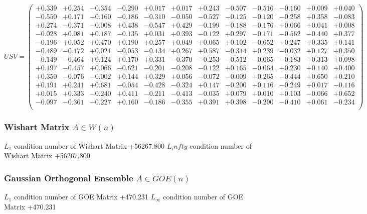 \documentclass[9pt]{article}
\theoremstyle{plain}
\theoremstyle{definition}
\theoremstyle{remark}
\numberwithin{equation}{section}
\begin{document}
$U S V = \left(
\begin{array}{
cccccccccccc}
+0.339 & +0.254 & -0.354 & -0.290 & +0.017 & +0.017 & +0.243 & -0.507 & -0.516 & -0.160 & +0.009 & +0.040 \\
-0.550 & +0.171 & -0.160 & -0.186 & -0.310 & -0.050 & -0.527 & -0.125 & -0.120 & -0.258 & +0.358 & -0.083 \\
+0.274 & -0.371 & -0.008 & +0.438 & -0.547 & +0.429 & -0.199 & -0.188 & -0.176 & +0.066 & +0.041 & +0.008 \\
-0.028 & +0.081 & +0.187 & -0.135 & +0.031 & +0.393 & -0.122 & +0.297 & -0.171 & -0.562 & -0.440 & +0.377 \\
-0.196 & +0.052 & +0.470 & +0.190 & +0.257 & +0.049 & +0.065 & +0.102 & -0.652 & +0.247 & +0.335 & +0.141 \\
-0.489 & -0.172 & +0.021 & -0.053 & -0.134 & +0.267 & +0.587 & -0.314 & +0.239 & -0.032 & +0.127 & +0.350 \\
-0.149 & -0.464 & +0.124 & +0.170 & +0.331 & -0.370 & -0.253 & -0.512 & -0.065 & -0.183 & -0.313 & +0.098 \\
+0.197 & -0.457 & +0.066 & -0.621 & -0.201 & -0.208 & -0.122 & +0.165 & -0.064 & +0.230 & +0.140 & +0.400 \\
+0.350 & -0.076 & -0.002 & +0.144 & +0.329 & +0.056 & -0.072 & -0.009 & +0.265 & -0.444 & +0.650 & +0.210 \\
+0.191 & +0.241 & +0.681 & -0.054 & -0.428 & -0.324 & +0.147 & -0.200 & +0.116 & -0.249 & +0.017 & -0.116 \\
+0.015 & +0.333 & -0.240 & +0.411 & -0.211 & -0.413 & -0.035 & +0.079 & +0.010 & +0.103 & -0.066 & +0.652 \\
-0.097 & -0.361 & -0.227 & +0.160 & -0.186 & -0.355 & +0.391 & +0.398 & -0.290 & -0.410 & +0.061 & -0.234 \\
\end{array}
\right)$ \newline 

\subsubsection{Wishart Matrix $A \in W(n)$}
$L_1$ condition number of Wishart Matrix +56267.800
$L_infty$ condition number of Wishart Matrix +56267.800
\subsubsection{Gaussian Orthogonal Ensemble $A \in GOE(n)$}
$L_1$ condition number of GOE Matrix +470.231
$L_\infty$ condition number of GOE Matrix +470.231
\end{document}
